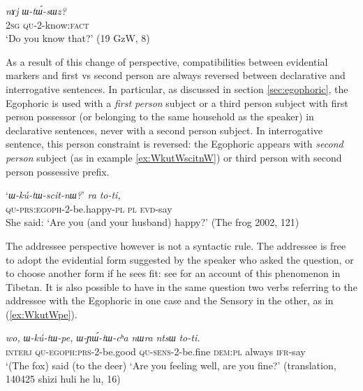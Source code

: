 \documentclass[11pt]{article}
\newcommand{\ipa}[1]{{\phon\textit{#1}}} %
\newcommand{\refb}[1]{(\ref{#1})}
\begin{document}
\begin{exe}
\ex \label{ex:WtWsWz}
\gll 
\ipa{nɤj}	\ipa{ɯ-tɯ́-sɯz?} \\
\textsc{2sg} \textsc{qu}-2-know:\textsc{fact} \\
\glt `Do you know that?' (19 GzW, 8)
\end{exe}

As a result of this change of perspective, compatibilities between evidential markers and first vs second person are always reversed between declarative and interrogative sentences. In particular, as discussed in section \ref{sec:egophoric}, the Egophoric is used with a \textit{first person} subject or a third person subject with first person possessor (or belonging to the same household as the speaker) in declarative sentences, never with a second person subject. In interrogative sentence, this person constraint is reversed: the Egophoric appears with \textit{second person} subject (as in example \ref{ex:WkutWscitnW}) or third person with second person possessive prefix. 


\begin{exe}
\ex \label{ex:WkutWscitnW}
\gll	`\ipa{ɯ-kú-tɯ-scit-nɯ?}' 	\ipa{ra} 	\ipa{to-ti,} \\
  \textsc{qu-prs:egoph}-2-be.happy-\textsc{pl} \textsc{pl} \textsc{evd}-say \\
\glt She said: `Are you (and your husband) happy?' (The frog 2002, 121)
\end{exe}

The addressee perspective however is not a syntactic rule. The addressee is free to adopt the evidential form suggested by the speaker who asked the question, or to choose another form if he sees fit: see \citet{garrett07symbiosis} for an account of this phenomenon in Tibetan. It is also possible to have in the same question two verbs referring to the addressee with the Egophoric in one case and the Sensory in the other, as in \refb{ex:WkutWpe}. 

\begin{exe}
\ex \label{ex:WkutWpe}
\gll 
\ipa{wo,} 	\ipa{ɯ-kú-tɯ-pe,} 	\ipa{ɯ-ɲɯ́-tɯ-cʰa} 	\ipa{nɯra} 	\ipa{ntsɯ} 	\ipa{to-ti.} \\
\textsc{interj} \textsc{qu-egoph:prs}-2-be.good \textsc{qu-sens}-2-be.fine \textsc{dem:pl} always \textsc{ifr}-say  \\
\glt `(The fox) said (to the deer) `Are you feeling well, are you fine?' (translation, 140425 shizi huli he lu, 16)
\end{exe}
\end{document}

